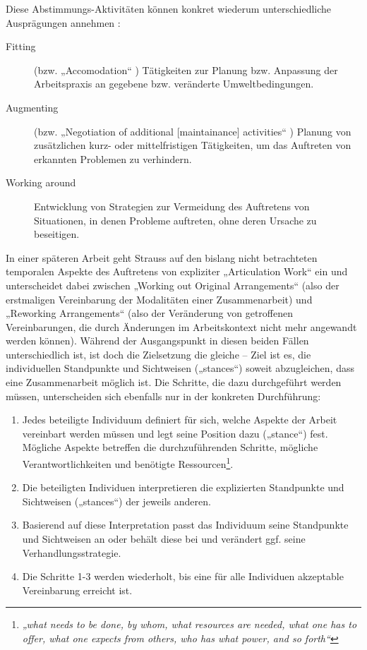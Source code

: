 Diese Abstimmungs-Aktivitäten können konkret wiederum unterschiedliche Ausprägungen annehmen \citep{Gasser86}:
\begin{description}
	\item[Fitting] (bzw. „Accomodation“ \citep{Bendifallah87}) Tätigkeiten zur Planung bzw. Anpassung der Arbeitspraxis an gegebene bzw. veränderte Umweltbedingungen.
	\item[Augmenting] (bzw. „Negotiation of additional [maintainance] activities“ \citep{Bendifallah87}) Planung von zusätzlichen kurz- oder mittelfristigen Tätigkeiten, um das Auftreten von erkannten Problemen zu verhindern. 
	\item[Working around] Entwicklung von Strategien zur Vermeidung des Auftretens von Situationen, in denen Probleme auftreten, ohne deren Ursache zu beseitigen.
\end{description}

In einer späteren Arbeit \citep{Corbin93} geht Strauss auf den bislang nicht betrachteten temporalen Aspekte des Auftretens von expliziter „Articulation Work“ ein und unterscheidet dabei zwischen „Working out Original Arrangements“ (also der erstmaligen Vereinbarung der Modalitäten einer Zusammenarbeit) und „Reworking Arrangements“ (also der Veränderung von getroffenen Vereinbarungen, die durch Änderungen im Arbeitskontext nicht mehr angewandt werden können). Während der Ausgangspunkt in diesen beiden Fällen unterschiedlich ist, ist doch die Zielsetzung die gleiche -- Ziel ist es, die individuellen Standpunkte und Sichtweisen („stances“) soweit abzugleichen, dass eine Zusammenarbeit möglich ist. Die Schritte, die dazu durchgeführt werden müssen, unterscheiden sich ebenfalls nur in der konkreten Durchführung:
\begin{enumerate}
	\item Jedes beteiligte Individuum definiert für sich, welche Aspekte der Arbeit vereinbart werden müssen und legt seine Position dazu („stance“) fest. Mögliche Aspekte betreffen die durchzuführenden Schritte, mögliche Verantwortlichkeiten und benötigte Ressourcen\footnote{\emph{„what needs to be done, by whom, what resources are needed, what one has to offer, what one expects from others, who has what power, and so forth“}\citep[][S. 76]{Corbin93}}. 
	\item Die beteiligten Individuen interpretieren die explizierten Standpunkte und Sichtweisen („stances“) der jeweils anderen. 
	\item Basierend auf diese Interpretation passt das Individuum seine Standpunkte und Sichtweisen an oder behält diese bei und verändert ggf. seine Verhandlungsstrategie.
	\item Die Schritte 1-3 werden wiederholt, bis eine für alle Individuen akzeptable Vereinbarung erreicht ist.
\end{enumerate}

